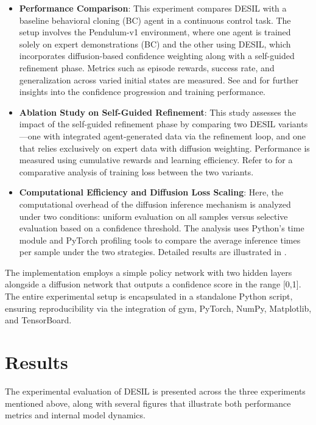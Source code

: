 \documentclass{article} %
\begin{document}
\begin{itemize}
  \item \textbf{Performance Comparison}: This experiment compares DESIL with a baseline behavioral cloning (BC) agent in a continuous control task. The setup involves the Pendulum-v1 environment\citep{Kairouz2021}, where one agent is trained solely on expert demonstrations (BC) and the other using DESIL, which incorporates diffusion-based confidence weighting along with a self-guided refinement phase. Metrics such as episode rewards, success rate, and generalization across varied initial states are measured. See  and  for further insights into the confidence progression and training performance.
  \item \textbf{Ablation Study on Self-Guided Refinement}: This study assesses the impact of the self-guided refinement phase by comparing two DESIL variants---one with integrated agent-generated data via the refinement loop, and one that relies exclusively on expert data with diffusion weighting. Performance is measured using cumulative rewards and learning efficiency. Refer to  for a comparative analysis of training loss between the two variants.
  \item \textbf{Computational Efficiency and Diffusion Loss Scaling}: Here, the computational overhead of the diffusion inference mechanism is analyzed under two conditions: uniform evaluation on all samples versus selective evaluation based on a confidence threshold. The analysis uses Python's time module and PyTorch profiling tools to compare the average inference times per sample under the two strategies. Detailed results are illustrated in .
\end{itemize}

The implementation employs a simple policy network with two hidden layers alongside a diffusion network that outputs a confidence score in the range [0,1]. The entire experimental setup is encapsulated in a standalone Python script, ensuring reproducibility via the integration of gym, PyTorch, NumPy\citep{Shaikh2014}, Matplotlib, and TensorBoard.

\section{Results}
\label{sec:results}
The experimental evaluation of DESIL is presented across the three experiments mentioned above, along with several figures that illustrate both performance metrics and internal model dynamics.
\end{document}
